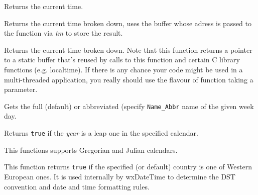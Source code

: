 
Returns the current time.


\label{wxdatetimegettmnow}


Returns the current time broken down, uses the buffer whose adress is
passed to the function via {\it tm} to store the result.



Returns the current time broken down. Note that this function returns a
pointer to a static buffer that's reused by calls to this function and
certain C library functions (e.g. localtime). If there is any chance your
code might be used in a multi-threaded application, you really should use
the flavour of function 
taking a parameter.

\label{wxdatetimegetweekdayname}


Gets the full (default) or abbreviated (specify {\tt Name\_Abbr} name of the
given week day.




\label{wxdatetimeisleapyear}


Returns {\tt true} if the {\it year} is a leap one in the specified calendar.

This functions supports Gregorian and Julian calendars.


\label{wxdatetimeiswesteuropeancountry}


This function returns {\tt true} if the specified (or default) country is one
of Western European ones. It is used internally by wxDateTime to determine the
DST convention and date and time formatting rules.


